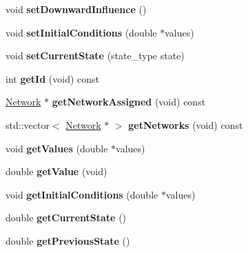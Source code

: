 \begin{DoxyCompactItemize}
\item 
void {\bfseries set\+Downward\+Influence} ()\hypertarget{classNode_acf0d5159faf93928dbfbe654feedd9a4}{}\label{classNode_acf0d5159faf93928dbfbe654feedd9a4}

\item 
void {\bfseries set\+Initial\+Conditions} (double $\ast$values)\hypertarget{classNode_acb93f815a8e880978604967e12b345fc}{}\label{classNode_acb93f815a8e880978604967e12b345fc}

\item 
void {\bfseries set\+Current\+State} (state\+\_\+type state)\hypertarget{classNode_a6b10486fcfffdc3ba4e92378c8b86fcd}{}\label{classNode_a6b10486fcfffdc3ba4e92378c8b86fcd}

\item 
int {\bfseries get\+Id} (void) const \hypertarget{classNode_a962c1706091481c7ae0552cf6232e1fe}{}\label{classNode_a962c1706091481c7ae0552cf6232e1fe}

\item 
\hyperlink{classNetwork}{Network} $\ast$ {\bfseries get\+Network\+Assigned} (void) const \hypertarget{classNode_aa8b0d5bdeeb3ca58b241e96f4bc7d662}{}\label{classNode_aa8b0d5bdeeb3ca58b241e96f4bc7d662}

\item 
std\+::vector$<$ \hyperlink{classNetwork}{Network} $\ast$ $>$ {\bfseries get\+Networks} (void) const \hypertarget{classNode_abb91c473b57d816afd9c3a3ebd8d8b8a}{}\label{classNode_abb91c473b57d816afd9c3a3ebd8d8b8a}

\item 
void {\bfseries get\+Values} (double $\ast$values)\hypertarget{classNode_a5fc3cc057fe9e72d71c207f369f88f34}{}\label{classNode_a5fc3cc057fe9e72d71c207f369f88f34}

\item 
double {\bfseries get\+Value} (void)\hypertarget{classNode_a2c5adb1557cf4326f42f02fe88706aaf}{}\label{classNode_a2c5adb1557cf4326f42f02fe88706aaf}

\item 
void {\bfseries get\+Initial\+Conditions} (double $\ast$values)\hypertarget{classNode_a642e190ff5343c6c9ffc86b8670a9a7c}{}\label{classNode_a642e190ff5343c6c9ffc86b8670a9a7c}

\item 
double {\bfseries get\+Current\+State} ()\hypertarget{classNode_a69708281dcb26b5c2068153cce56de32}{}\label{classNode_a69708281dcb26b5c2068153cce56de32}

\item 
double {\bfseries get\+Previous\+State} ()\hypertarget{classNode_a6aa927856c01c3e3849fb79db03a4232}{}\label{classNode_a6aa927856c01c3e3849fb79db03a4232}

\end{DoxyCompactItemize}
